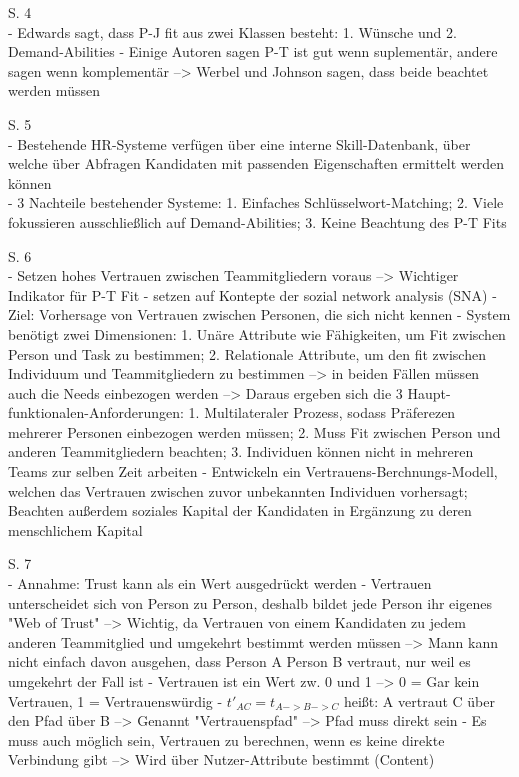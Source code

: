 S. 4\\
- Edwards sagt, dass P-J fit aus zwei Klassen besteht: 1. Wünsche und 2. Demand-Abilities
- Einige Autoren sagen P-T ist gut wenn suplementär, andere sagen wenn komplementär --> Werbel und Johnson sagen, dass beide beachtet werden müssen

S. 5\\
- Bestehende HR-Systeme verfügen über eine interne Skill-Datenbank, über welche über Abfragen Kandidaten mit passenden Eigenschaften ermittelt werden können\\
- 3 Nachteile bestehender Systeme: 1. Einfaches Schlüsselwort-Matching; 2. Viele fokussieren ausschließlich auf Demand-Abilities; 3. Keine Beachtung des P-T Fits

S. 6\\
- Setzen hohes Vertrauen zwischen Teammitgliedern voraus --> Wichtiger Indikator für P-T Fit
- setzen auf Kontepte der sozial network analysis (SNA)
- Ziel: Vorhersage von Vertrauen zwischen Personen, die sich nicht kennen
- System benötigt zwei Dimensionen: 1. Unäre Attribute wie Fähigkeiten, um Fit zwischen Person und Task zu bestimmen; 2. Relationale Attribute, um den fit zwischen Individuum und Teammitgliedern zu bestimmen --> in beiden Fällen müssen auch die Needs einbezogen werden --> Daraus ergeben sich die 3 Haupt-funktionalen-Anforderungen: 1. Multilateraler Prozess, sodass Präferezen mehrerer Personen einbezogen werden müssen; 2. Muss Fit zwischen Person und anderen Teammitgliedern beachten; 3. Individuen können nicht in mehreren Teams zur selben Zeit arbeiten
- Entwickeln ein Vertrauens-Berchnungs-Modell, welchen das Vertrauen zwischen zuvor unbekannten Individuen vorhersagt; Beachten außerdem soziales Kapital der Kandidaten in Ergänzung zu deren menschlichem Kapital

S. 7\\
- Annahme: Trust kann als ein Wert ausgedrückt werden
- Vertrauen unterscheidet sich von Person zu Person, deshalb bildet jede Person ihr eigenes "Web of Trust" --> Wichtig, da Vertrauen von einem Kandidaten zu jedem anderen Teammitglied und umgekehrt bestimmt werden müssen --> Mann kann nicht einfach davon ausgehen, dass Person A Person B vertraut, nur weil es umgekehrt der Fall ist
- Vertrauen ist ein Wert zw. 0 und 1 --> 0 = Gar kein Vertrauen, 1 = Vertrauenswürdig
- $t'_{AC} = t_{A->B->C}$ heißt: A vertraut C über den Pfad über B --> Genannt "Vertrauenspfad" --> Pfad muss direkt sein
- Es muss auch möglich sein, Vertrauen zu berechnen, wenn es keine direkte Verbindung gibt --> Wird über Nutzer-Attribute bestimmt (Content)

